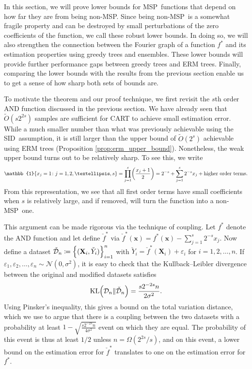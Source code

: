 \documentclass[11pt]{article}
\newcommand{\bx}{\mathbf{x}}
\newcommand{\bX}{\mathbf{X}}
\DeclarePairedDelimiter{\braces}{\lbrace}{\rbrace}
\DeclarePairedDelimiter{\paren}{(}{)}
\newcommand{\indicator}{\mathbb{1}}
\newcommand{\KL}{\operatorname{KL}}
\newcommand{\sparsity}{s}
\newcommand{\nsamples}{n}
\newcommand{\data}[1][n]{\mathcal{D}_{#1}}
\newcommand{\MSP}{\textsf{MSP}}
\newcommand{\SID}{\textsf{SID}}
\newcommand{\modifieddata}{\check{\mathcal{D}}_\nsamples}
\begin{document}
In this section, we will prove lower bounds for \MSP~functions that depend on how far they are from being non-\MSP.
Since being non-\MSP~is a somewhat fragile property and can be destroyed by small perturbations of the zero coefficients of the function, we call these robust lower bounds. 
In doing so, we will also strengthen the connection between the Fourier graph of a function $f^*$ and its estimation properties using greedy trees and ensembles.
These lower bounds will provide further performance gaps between greedy trees and ERM trees.
Finally, comparing the lower bounds with the results from the previous section enable us to get a sense of how sharp both sets of bounds are.

To motivate the theorem and our proof technique, we first revisit the $s$th order AND function discussed in the previous section.
We have already seen that $\tilde{O}(\sparsity2^{2\sparsity})$ samples are sufficient for CART to achieve small estimation error.
While a much smaller number than what was previously achievable using the \SID~assumption, it is still larger than the upper bound of $\tilde{O}(2^s)$ achievable using ERM trees (Proposition \ref{prop:erm_upper_bound}).
Nonetheless, the weak upper bound turns out to be relatively sharp.
To see this, we write
\begin{equation}
        \indicator\braces*{x_j = 1 \colon j =1,2,\ldots,\sparsity} = \prod_{j=1}^\sparsity \paren*{\frac{x_j + 1}{2}}
         = 2^{-\sparsity} + \sum_{j=1}^\sparsity  2^{-\sparsity} x_j + \text{higher order terms}.
\end{equation}
From this representation, we see that all first order terms have small coefficients when $\sparsity$ is relatively large, and if removed, will turn the function into a non-\MSP~one.

This argument can be made rigorous via the technique of coupling.
Let $f^*$ denote the AND function and let define $\check f^*$ via $\check f^*(\bx) = f^*(\bx) - \sum_{j=1}^\sparsity  2^{-\sparsity} x_j$.
Now define a dataset $\modifieddata \coloneqq \braces*{(\bX_i,\check Y_i)}_{i=1}^\nsamples$ with $\check Y_i = \check f^*(\bX_i) + \varepsilon_i$ for $i=1,2,\ldots,\nsamples$.
If $\varepsilon_1,\varepsilon_2,\ldots,\varepsilon_\nsamples \sim \mathcal{N}(0,\sigma^2)$, it is easy to check that the Kullback–Leibler divergence between the original and modified datasets satisfies
\begin{equation}
    \KL\paren*{\data\| \modifieddata} = \frac{\sparsity2^{-2\sparsity}\nsamples}{2\sigma^2}.
\end{equation}
Using Pinsker's inequality, this gives a bound on the total variation distance, which we use to argue that there is a coupling between the two datasets with a probability at least $1-\sqrt{\frac{s2^{-2s}n}{4\sigma^2}}$ event on which they are equal.
The probability of this event is thus at least $1/2$ unless $\nsamples = \Omega(2^{2s}/s)$, and on this event, a lower bound on the estimation error for $\check f^*$ translates to one on the estimation error for $f^*$.
\end{document}
